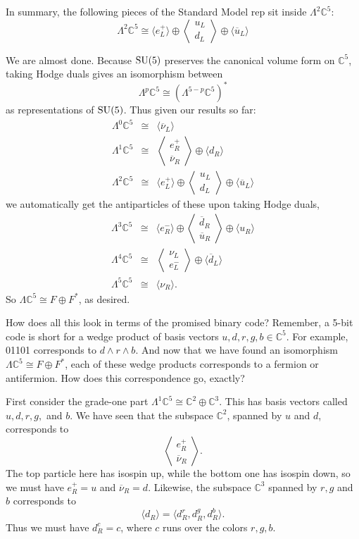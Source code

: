 \documentclass{article}
\newcommand{\C}{{\mathbb C}}  %
\newcommand{\SU}{{\rm SU}}    %
\newcommand{\Ex}{\Lambda} %
\newcommand{\iso}{\cong} %
\newcommand{\ubar}{\overline{u}} %
\newcommand{\dbar}{\overline{d}} %
\newcommand{\nubar}{\overline{\nu}} %
\newcommand{\anglep}{\left\langle \! \begin{array}{c} \nu_L \\ e^-_L \end{array} \! \right\rangle} %
\newcommand{\angantilep}{\left\langle \! \begin{array}{c} e^+_R \\ \nubar_R \end{array} \! \right\rangle} %
\newcommand{\angquark}{\left\langle \! \begin{array}{c} u_L \\ d_L \end{array} \! \right\rangle} %
\newcommand{\angantiquark}{\left\langle \! \begin{array}{c} \dbar_R \\ \ubar_R \end{array} \! \right\rangle} %
\begin{document}
In summary, the following pieces of the Standard Model rep
sit inside $\Ex^2 \C^5$:
\[ \Ex^2 \C^5 \iso \langle e^+_L \rangle \oplus \angquark \oplus 
\langle \ubar_L \rangle \]

We are almost done. Because $\SU(5)$ preserves the canonical volume form on
$\C^5$, taking Hodge duals gives an isomorphism between
\[ \Ex^p \C^5 \iso (\Ex^{5 - p} \C^5)^* \]
as representations of $\SU(5)$.  Thus given our results so far:
\begin{eqnarray*}
\Ex^0 \C^5 & \iso & \langle \nubar_L \rangle \\
\Ex^1 \C^5 & \iso & \angantilep \oplus \langle d_R \rangle \\
\Ex^2 \C^5 & \iso & \langle e^+_L \rangle \oplus \angquark \oplus 
\langle \ubar_L \rangle
\end{eqnarray*}
we automatically get the antiparticles of these upon taking Hodge duals,
\begin{eqnarray*}
\Ex^3 \C^5 & \iso & \langle e^-_R \rangle \oplus \angantiquark \oplus 
\langle u_R \rangle \\
\Ex^4 \C^5 & \iso & \anglep \oplus \langle \dbar_L \rangle \\
\Ex^5 \C^5 & \iso & \langle \nu_R \rangle.
\end{eqnarray*}
So $\Ex \C^5 \iso F \oplus F^*$, as desired.

How does all this look in terms of the promised binary code? 
Remember, a 5-bit code is short for a wedge product of
basis vectors $u,d,r,g,b \in \C^5$.  For example, 01101 corresponds
to $d \wedge r \wedge b$.  And now that we have found an isomorphism 
$\Ex \C^5 \iso F \oplus F^*$, each of these wedge products corresponds
to a fermion or antifermion.  How does this correspondence go, exactly?
 
First consider the grade-one part $\Ex^1 \C^5 \iso \C^2 \oplus \C^3$.
This has basis vectors called $u,d,r,g,$ and $b$.  We have seen that
the subspace $\C^2$, spanned by $u$ and $d$, corresponds to 
\[   \angantilep.   \]
The top particle here has isospin up, while the bottom one has
isospin down, so we must have $e^+_R = u$ and $\nubar_R = d$.
Likewise, the subspace $\C^3$ spanned by $r,g$ and $b$ corresponds to
\[     \langle d_R \rangle = \langle d_R^r, d_R^g, d_R^b \rangle . \] 
Thus we must have $d^c_R = c$, where $c$ runs over the colors $r,g,b$.
\end{document}
